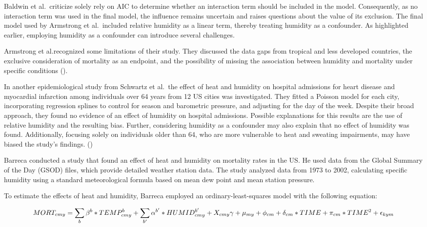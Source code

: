 \documentclass[
]{krantz}
\begin{document}
Baldwin et al.~criticize solely rely on AIC to determine whether an interaction term should be included in the model. Consequently, as no interaction term was used in the final model, the influence remains uncertain and raises questions about the value of its exclusion. The final model used by Armstrong et al.~included relative humidity as a linear term, thereby treating humidity as a confounder. As highlighted earlier, employing humidity as a confounder can introduce several challenges.

Armstrong et al.recognized some limitations of their study. They discussed the data gaps from tropical and less developed countries, the exclusive consideration of mortality as an endpoint, and the possibility of missing the association between humidity and mortality under specific conditions (\citet{armstrong}).

In another epidemiological study from Schwartz et al.~the effect of heat and humidity on hospital admissions for heart disease and myocardial infarction among individuals over 64 years from 12 US cities was investigated. They fitted a Poisson model for each city, incorporating regression splines to control for season and barometric pressure, and adjusting for the day of the week. Despite their broad approach, they found no evidence of an effect of humidity on hospital admissions. Possible explanations for this results are the use of relative humidity and the resulting bias. Further, considering humidity as a confounder may also explain that no effect of humidity was found. Additionally, focusing solely on individuals older than 64, who are more vulnerable to heat and sweating impairments, may have biased the study's findings. (\citet{schwartz})

Barreca conducted a study that found an effect of heat and humidity on mortality rates in the US. He used data from the Global Summary of the Day (GSOD) files, which provide detailed weather station data. The study analyzed data from 1973 to 2002, calculating specific humidity using a standard meteorological formula based on mean dew point and mean station pressure.

To estimate the effects of heat and humidity, Barreca employed an ordinary-least-squares model with the following equation:

\[
MORT_{cmy} = \sum_b \beta^b*TEMP^b_{cmy} + \sum_{b'} \alpha^{b'} * HUMID^{b'}_{cmy} + X_{cmy} \gamma + \mu_{my} + \\
\phi_{cm} + \delta_{cm} * TIME + \pi_{cm}*TIME^2 + \epsilon_{kym}
\]
\end{document}
